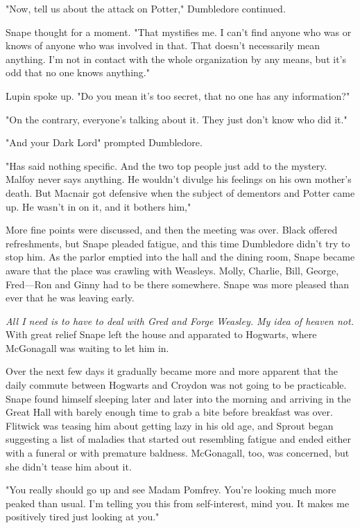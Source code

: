 "Now, tell us about the attack on Potter," Dumbledore continued.

Snape thought for a moment. "That mystifies me. I can't find anyone who was or knows of anyone who was involved in that. That doesn't necessarily mean anything. I'm not in contact with the whole organization by any means, but it's odd that no one knows anything."

Lupin spoke up. "Do you mean it's too secret, that no one has any information?"

"On the contrary, everyone's talking about it. They just don't know who did it."

"And your Dark Lord{\el}" prompted Dumbledore.

"Has said nothing specific. And the two top people just add to the mystery. Malfoy never says anything. He wouldn't divulge his feelings on his own mother's death. But Macnair got defensive when the subject of dementors and Potter came up. He wasn't in on it, and it bothers him,"

More fine points were discussed, and then the meeting was over. Black offered refreshments, but Snape pleaded fatigue, and this time Dumbledore didn't try to stop him. As the parlor emptied into the hall and the dining room, Snape became aware that the place was crawling with Weasleys. Molly, Charlie, Bill, George, Fred—Ron and Ginny had to be there somewhere. Snape was more pleased than ever that he was leaving early.

\emph{All I need is to have to deal with Gred and Forge Weasley. My idea of heaven{\el} not.} With great relief Snape left the house and apparated to Hogwarts, where McGonagall was waiting to let him in.

Over the next few days it gradually became more and more apparent that the daily commute between Hogwarts and Croydon was not going to be practicable. Snape found himself sleeping later and later into the morning and arriving in the Great Hall with barely enough time to grab a bite before breakfast was over. Flitwick was teasing him about getting lazy in his old age, and Sprout began suggesting a list of maladies that started out resembling fatigue and ended either with a funeral or with premature baldness. McGonagall, too, was concerned, but she didn't tease him about it.

"You really should go up and see Madam Pomfrey. You're looking much more peaked than usual. I'm telling you this from self-interest, mind you. It makes me positively tired just looking at you."

